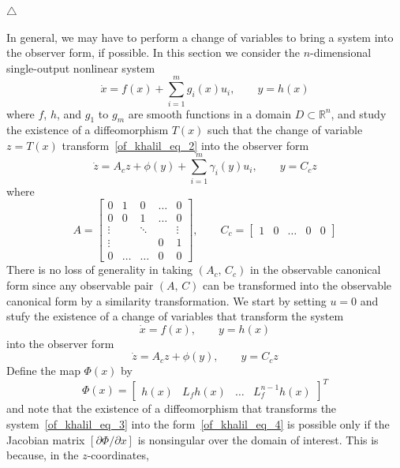 \documentclass[12pt,a4paper,oneside]{book}
\begin{document}
\begin{onehalfspace}
\begin{example}
	\hfill$\triangle$
\end{example}
In general, we may have to perform a change of variables to bring a system into the observer form, if possible. In this section we consider the $n$-dimensional single-output nonlinear system
\begin{equation}\label{of_khalil_eq_2}
	\dot{x}=f(x)+\sum_{i=1}^{m}g_i(x)u_i,\qquad y=h(x)
\end{equation}
where $f$, $h$, and $g_1$ to $g_m$ are smooth functions in a domain $D\subset \mathbb{R}^n$, and study the existence of a diffeomorphism $T(x)$ such that the change of variable $z=T(x)$ transform~\eqref{of_khalil_eq_2} into the observer form
\begin{equation}\label{of_khalil_eq_2b}
	\dot{z}=A_cz+\phi(y) + \sum_{i=1}^{m}\gamma_i(y)u_i,\qquad y=C_cz
\end{equation}
where
\begin{equation*}
	A=\begin{bmatrix} 0&1&0&\dots&0 \\[6pt] 0&0&1&\dots&0 \\[6pt] \vdots& &\ddots& &\vdots \\[6pt] \vdots& & &0&1 \\[6pt] 0&\dots&\dots&0&0	\end{bmatrix},\qquad C_c=\begin{bmatrix} 1&0&\dots&0&0\end{bmatrix}
\end{equation*}
There is no loss of generality in taking $(A_c,\,C_c)$ in the observable canonical form since any observable pair $(A,\,C)$ can be transformed into the observable canonical form by a similarity transformation.  We start by setting $u=0$ and stufy the existence of a change of variables that transform the system
\begin{equation}\label{of_khalil_eq_3}
	\dot{x}=f(x),\qquad y=h(x)
\end{equation}
into the observer form
\begin{equation}\label{of_khalil_eq_4}
	\dot{z}=A_cz+\phi(y),\qquad y=C_cz
\end{equation}
Define the map $\Phi(x)$ by
\begin{equation*}
	\Phi(x)=\begin{bmatrix} h(x)&L_fh(x)&\dots&L_f^{n-1}h(x) \end{bmatrix}^T
\end{equation*}
and note that the existence of a diffeomorphism that transforms the system~\eqref{of_khalil_eq_3} into the form~\eqref{of_khalil_eq_4} is possible only if the Jacobian matrix $[\partial \Phi/\partial x]$ is nonsingular over the domain of interest. This is because, in the $z$-coordinates,

\end{onehalfspace}
\end{document}
